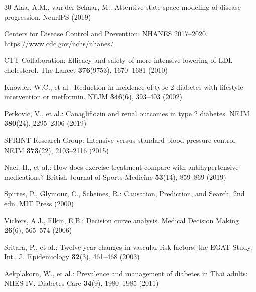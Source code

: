 \documentclass[runningheads]{llncs}
\begin{document}
\begin{thebibliography}{30}
Alaa, A.M., van der Schaar, M.:
Attentive state-space modeling of disease progression.
NeurIPS (2019)

Centers for Disease Control and Prevention:
NHANES 2017--2020.
\url{https://www.cdc.gov/nchs/nhanes/}

CTT Collaboration:
Efficacy and safety of more intensive lowering of LDL cholesterol.
The Lancet \textbf{376}(9753), 1670--1681 (2010)

Knowler, W.C., et al.:
Reduction in incidence of type 2 diabetes with lifestyle intervention or metformin.
NEJM \textbf{346}(6), 393--403 (2002)

Perkovic, V., et al.:
Canagliflozin and renal outcomes in type 2 diabetes.
NEJM \textbf{380}(24), 2295--2306 (2019)

SPRINT Research Group:
Intensive versus standard blood-pressure control.
NEJM \textbf{373}(22), 2103--2116 (2015)

Naci, H., et al.:
How does exercise treatment compare with antihypertensive medications?
British Journal of Sports Medicine \textbf{53}(14), 859--869 (2019)

Spirtes, P., Glymour, C., Scheines, R.:
Causation, Prediction, and Search, 2nd edn.
MIT Press (2000)

Vickers, A.J., Elkin, E.B.:
Decision curve analysis.
Medical Decision Making \textbf{26}(6), 565--574 (2006)

Sritara, P., et al.:
Twelve-year changes in vascular risk factors: the EGAT Study.
Int.\ J.\ Epidemiology \textbf{32}(3), 461--468 (2003)

Aekplakorn, W., et al.:
Prevalence and management of diabetes in Thai adults: NHES IV.
Diabetes Care \textbf{34}(9), 1980--1985 (2011)

\end{thebibliography}
\end{document}
